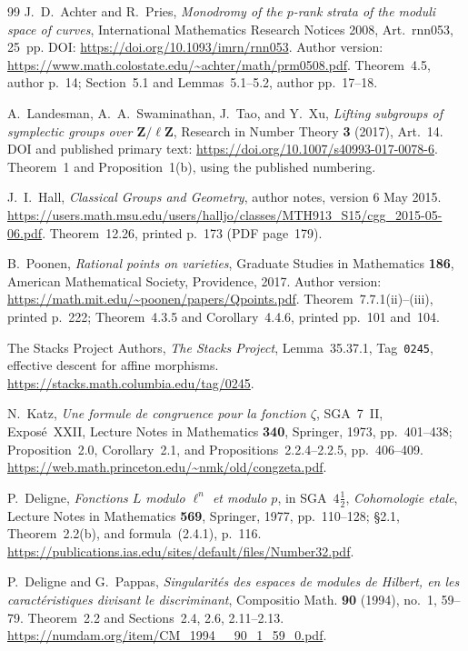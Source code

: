 \documentclass[11pt,a4paper]{article}
\begin{document}
\begin{thebibliography}{99}
J.~D.~Achter and R.~Pries,
\emph{Monodromy of the $p$-rank strata of the moduli space of curves},
International Mathematics Research Notices 2008,
Art.~rnn053, 25~pp.
DOI: \url{https://doi.org/10.1093/imrn/rnn053}.
Author version:
\url{https://www.math.colostate.edu/~achter/math/prm0508.pdf}.
Theorem~4.5, author p.~14; Section~5.1 and Lemmas~5.1--5.2,
author pp.~17--18.

A.~Landesman, A.~A.~Swaminathan, J.~Tao, and Y.~Xu,
\emph{Lifting subgroups of symplectic groups over
$\mathbf Z/\ell\mathbf Z$},
Research in Number Theory \textbf{3} (2017), Art.~14.
DOI and published primary text:
\url{https://doi.org/10.1007/s40993-017-0078-6}.
Theorem~1 and Proposition~1(b), using the published numbering.

J.~I.~Hall, \emph{Classical Groups and Geometry},
author notes, version 6 May 2015.
\url{https://users.math.msu.edu/users/halljo/classes/MTH913_S15/cgg_2015-05-06.pdf}.
Theorem~12.26, printed p.~173 (PDF page~179).

B.~Poonen, \emph{Rational points on varieties},
Graduate Studies in Mathematics \textbf{186},
American Mathematical Society, Providence, 2017.
Author version: \url{https://math.mit.edu/~poonen/papers/Qpoints.pdf}.
Theorem~7.7.1(ii)--(iii), printed p.~222;
Theorem~4.3.5 and Corollary~4.4.6, printed pp.~101 and~104.

The Stacks Project Authors,
\emph{The Stacks Project}, Lemma~35.37.1,
Tag~\texttt{0245}, effective descent for affine morphisms.
\url{https://stacks.math.columbia.edu/tag/0245}.

N.~Katz, \emph{Une formule de congruence pour la fonction
$\zeta$}, SGA~7~II, Expos\'e~XXII, Lecture Notes in
Mathematics \textbf{340}, Springer, 1973, pp.~401--438;
Proposition~2.0, Corollary~2.1, and Propositions~2.2.4--2.2.5,
pp.~406--409.
\url{https://web.math.princeton.edu/~nmk/old/congzeta.pdf}.

P.~Deligne, \emph{Fonctions $L$ modulo $\ell^n$ et modulo $p$},
in SGA~$4\frac12$, \emph{Cohomologie etale}, Lecture Notes in
Mathematics \textbf{569}, Springer, 1977, pp.~110--128;
\S2.1, Theorem~2.2(b), and formula~(2.4.1), p.~116.
\url{https://publications.ias.edu/sites/default/files/Number32.pdf}.

P.~Deligne and G.~Pappas,
\emph{Singularit\'es des espaces de modules de Hilbert, en les
caract\'eristiques divisant le discriminant},
Compositio Math. \textbf{90} (1994), no.~1, 59--79.
Theorem~2.2 and Sections~2.4, 2.6, 2.11--2.13.
\url{https://numdam.org/item/CM_1994__90_1_59_0.pdf}.


\end{thebibliography}
\end{document}
